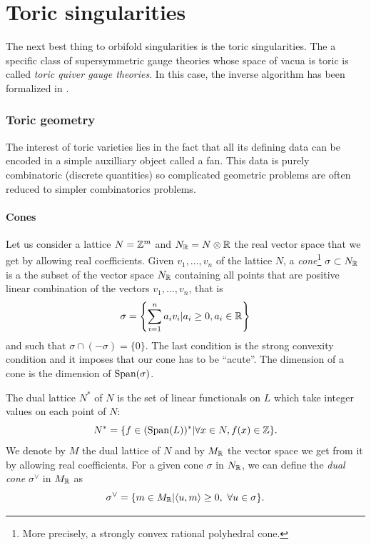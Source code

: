 



\part{Toric singularities}

    The next best thing to orbifold singularities is the toric singularities.  The a specific class of supersymmetric gauge theories whose space of vacua is toric is called \emph{toric quiver gauge theories}. In this case, the inverse algorithm has been formalized in \cite{Feng_2001}.

\section{Toric geometry}

    The interest of toric varieties lies in the fact that all its defining data can be encoded in a simple auxilliary object called a fan. This data is purely combinatoric (discrete quantities) so complicated geometric problems are often reduced to simpler combinatorics problems.

    \subsection{Cones}

        Let us consider a lattice $N=\mathbb{Z}^m$ and $N_{\mathbb{R}}=N\otimes\mathbb{R}$ the real vector space that we get by allowing real coefficients. Given $v_1,\dots,v_n$ of the lattice $N$, a \emph{cone}\footnote{More precisely, a strongly convex rational polyhedral cone.} $\sigma\subset N_{\mathbb{R}}$ is a the subset of the vector space $N_{\mathbb{R}}$ containing all points that are positive linear combination of the vectors $v_1,\dots,v_n$, that is
        \begin{equation}
            \sigma=\left\{\sum^n_{i=1}a_iv_i|a_i\geq0,a_i\in\mathbb{R}\right\}
        \end{equation}
        and such that $\sigma\cap(-\sigma)=\{0\}$. The last condition is the strong convexity condition and it imposes that our cone has to be ``acute''. The dimension of a cone is the dimension of $\text{Span}(\sigma)$.
        
        The dual lattice $N^*$ of $N$ is the set of linear functionals on $L$ which take integer values on each point of $N$:
        \begin{equation}
            N^*=\{f\in(\text{Span}(L))^*|\forall x\in N,f(x)\in\mathbb{Z}\}.
        \end{equation}
        We denote by $M$ the dual lattice of $N$ and by $M_{\mathbb{R}}$ the vector space we get from it by allowing real coefficients. For a given cone $\sigma$ in $ N_{\mathbb{R}}$, we can define the \emph{dual cone} $\sigma^\vee$ in $M_{\mathbb{R}}$ as
        \begin{equation}
            \sigma^\vee=\{m\in M_{\mathbb{R}}|\langle u,m\rangle\geq0,~ \forall u\in\sigma\}.
        \end{equation}

